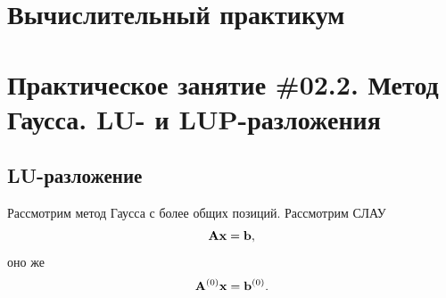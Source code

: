 \documentclass[12pt]{article}
\begin{document}
    \begin{flushright}
    \end{flushright}
    \begin{flushright}
    \end{flushright}
    \section*{Вычислительный практикум}
    \section*{Практическое занятие \#02.2. Метод Гаусса. LU- и LUP-разложения}

    \subsection*{LU-разложение}

    Рассмотрим метод Гаусса с более общих позиций. Рассмотрим СЛАУ
    \begin{equation}
        \bold{Ax}=\bold{b},
        \label{7.2:f1}
    \end{equation}
    оно же
    \begin{equation}
        \bold{A}^{\left(0\right)}\bold{x}=\bold{b}^{\left(0\right)}.
        \label{7.2:f2}
    \end{equation}
\end{document}
